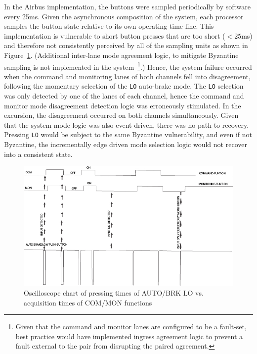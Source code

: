 In the Airbus implementation, the buttons were sampled periodically by software
every 25ms. Given the asynchronous composition of the system, each processor
samples the button state relative to its own operating time-line. This
implementation is vulnerable to short button presses that are too short ($< 25$ms)
and therefore not consistently perceived by all of the sampling units as shown in Figure~\ref{fig:push_button_sampling}.
(Additional inter-lane mode agreement logic, to mitigate Byzantine sampling is
not implemented in the system~\footnote{Given that the command and monitor lanes
  are configured to be a fault-set, best practice would have implemented ingress
  agreement logic to prevent a fault external to the pair from disrupting the
  paired agreement.}.) Hence, the system failure occurred when the command and
monitoring lanes of both channels fell into disagreement, following the momentary 
selection of the \texttt{LO} auto-brake mode. The \texttt{LO} selection was only detected by one
of the lanes of each channel, hence the command and monitor mode disagreement
detection logic was erroneously stimulated. In the excursion, the disagreement
occurred on both channels simultaneously. Given that the system mode logic was
also event driven, there was no path to recovery. Pressing \texttt{LO} would be subject
to the same Byzantine vulnerability, and even if not Byzantine, the
incrementally edge driven mode selection logic would not recover into a
consistent state.

\begin{figure}
\begin{center}
\includegraphics[width=\textwidth]{figures/newtrace.jpg}
\caption{Oscilloscope chart of pressing times of AUTO/BRK LO vs. acquisition times of COM/MON functions}
\label{fig:push_button_sampling}
\end{center}
\end{figure}

